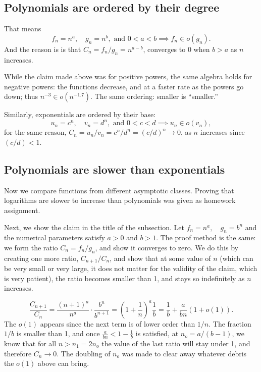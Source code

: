 \documentclass[11pt]{article}
\newcommand{\DS}{\displaystyle}
\newcommand{\lp}{\left(}
\newcommand{\rp}{\right)}
\begin{document}
\subsection{Polynomials are ordered by their degree}
That means
\[
f_n = n^a, \quad g_n=n^b, \text{ and } 0<a<b \implies f_n \in o(g_n).
\]
And the reason is is that
$C_n = f_n/g_n =n^{a-b}$, converges to $0$ when $b>a$ as $n$ increases.

While the claim made above was for positive powers, the same algebra holds
for negative powers: the functions decrease, and at a faster rate as the
powers go down; thus $n^{-3} \in o\lp n^{-1.7}\rp$.  The same ordering:
smaller is ``smaller.''

Similarly, exponentials are ordered by their base:
\[
u_n = c^n, \quad v_n=d^n, \text{ and } 0<c<d \implies u_n \in o(v_n),
\]
for the same reason,
$ C_n =u_n/v_n =c^n/d^n = (c/d)^n\to 0$, as $n$ increases since $(c/d)<1$.

\subsection{Polynomials are slower than exponentials}
Now we compare functions from different asymptotic classes.  Proving that
logarithms are slower to increase than polynomials was given as homework
assignment.

Next, we show the claim in the title of the subsection.  Let
$f_n = n^a, \quad g_n=b^n$ and the numerical parameters satisfy
$a>0$ and $b>1$.  The proof method is the same: we form the ratio
$C_n = f_n/g_n$, and show it converges to zero.  We do this by creating
one more ratio, $C_{n+1}/C_n$, and show that at some value of $n$ (which can
be very small or very large, it does not matter for the validity of the
claim, which is very patient), the ratio becomes smaller than 1, and
stays so indefinitely as $n$ increases.

\[
\frac{C_{n+1}}{C_n} = \frac{(n+1)^a}{n^a} \cdot \frac{b^n}{b^{n+1}}
= \lp 1+\frac1n\rp^a \frac1b = \frac1b+\frac a{bn}\lp1+o(1)\rp.
\]
The $o(1)$ appears since the next term is of lower order than $1/n$.
The fraction $1/b$ is smaller than 1, and once $\DS \frac a{bn}<1-\frac1b$ is
satisfied, at $n_o=a/(b-1)$, we know that for all $n> n_1=2n_o$ the value
of the last ratio will stay under 1, and therefore $C_n\to0$.
The doubling of $n_o$
was made to clear away whatever debris the $o(1)$ above can bring.


\end{document}
